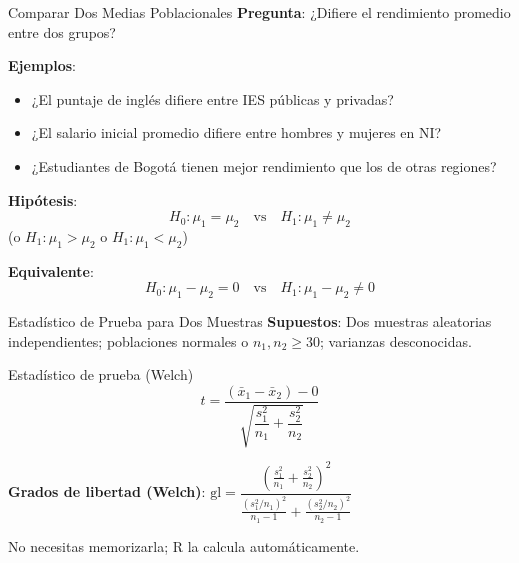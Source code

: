 \documentclass[aspectratio=169, 11pt]{beamer}
\begin{document}
\begin{frame}{Comparar Dos Medias Poblacionales}
\textbf{Pregunta}: ¿Difiere el rendimiento promedio entre dos grupos?

\vspace{0.3cm}
\textbf{Ejemplos}:
\begin{itemize}
  \item ¿El puntaje de inglés difiere entre IES públicas y privadas?
  \item ¿El salario inicial promedio difiere entre hombres y mujeres en NI?
  \item ¿Estudiantes de Bogotá tienen mejor rendimiento que los de otras regiones?
\end{itemize}

\vspace{0.3cm}
\textbf{Hipótesis}:
\[
H_0: \mu_1 = \mu_2 \quad \text{vs} \quad H_1: \mu_1 \neq \mu_2
\]
(o $H_1: \mu_1 > \mu_2$ o $H_1: \mu_1 < \mu_2$)

\vspace{0.3cm}
\textbf{Equivalente}:
\[
H_0: \mu_1 - \mu_2 = 0 \quad \text{vs} \quad H_1: \mu_1 - \mu_2 \neq 0
\]
\end{frame}

\begin{frame}{Estadístico de Prueba para Dos Muestras}
\textbf{Supuestos}: Dos muestras aleatorias \alert{independientes}; poblaciones normales o $n_1, n_2 \geq 30$; varianzas desconocidas.

\vspace{0.2cm}
\begin{block}{Estadístico de prueba (Welch)}
\[
t = \frac{(\bar{x}_1 - \bar{x}_2) - 0}{\sqrt{\dfrac{s_1^2}{n_1} + \dfrac{s_2^2}{n_2}}}
\]
\end{block}

\vspace{0.2cm}
\textbf{Grados de libertad (Welch)}: \quad
$\text{gl} = \dfrac{\left(\frac{s_1^2}{n_1} + \frac{s_2^2}{n_2}\right)^2}{\frac{(s_1^2/n_1)^2}{n_1-1} + \frac{(s_2^2/n_2)^2}{n_2-1}}$

\smallskip
\small No necesitas memorizarla; R la calcula automáticamente.
\end{frame}
\end{document}
